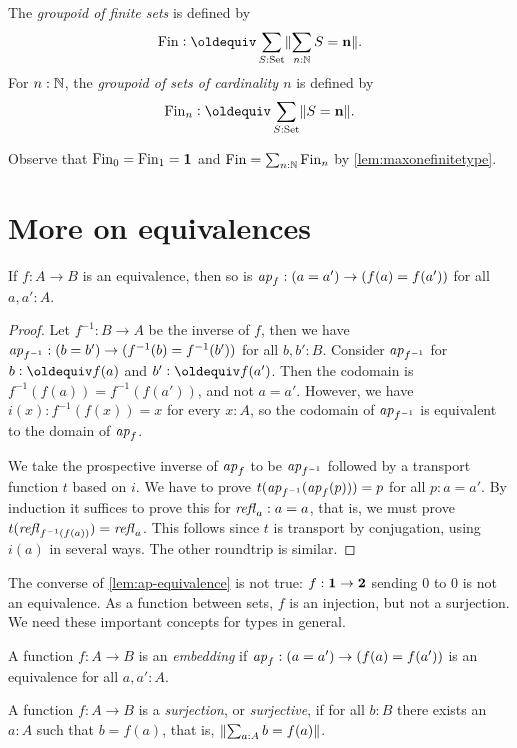 \begin{definition}
\begin{definition}\label{def:groupoidFin}
The \emph{groupoid of finite sets} is defined by
\[
\fin\defeq\sum_{S:\Set}\Trunc{\sum_{n:\NN}S=\bn{n}}.
\]
For $n:\mathbb{N}$, the \emph{groupoid of sets of cardinality $n$} is defined by
\[
\fin_n\defequi \sum_{S:\Set}\Trunc{S=\bn{n}}.
\]
\end{definition}
Observe that $\operatorname{Fin}_0=\operatorname{Fin}_1=\mathbf{1} $ and $\operatorname{Fin}=\sum_{n:\mathbb{N}}\operatorname{Fin}_n$
by \cref{lem:maxonefinitetype}.

\section{More on equivalences}
\label{sec:more-on-equivalences}

\begin{lemma}\label{lem:ap-equivalence}
If $f:A\to B$ is an equivalence, then so is
$\mathop{{\it ap}_{f}}: (a=a') \to (f(a)=f(a'))$ for all $a,a':A$.
\end{lemma}
\begin{proof}
Let $f^{-1} : B\to A$ be the inverse of $f$, then we have 
$\mathop{{\it ap}_{f^{-1}}}: (b=b') \to (f^{-1}(b)=f^{-1}(b'))$ for all $b,b':B$.
Consider $\mathop{{\it ap}_{f^{-1}}}$ for $b\defeq f(a)$ and $b'\defeq f(a')$.
Then the codomain is $f^{-1}(f(a))=f^{-1}(f(a'))$, and not $a=a'$.
However, we have $i(x):f^{-1}(f(x))=x$ for every $x:A$, so the 
codomain of $\mathop{{\it ap}_{f^{-1}}}$ is equivalent to the domain of $\mathop{{\it ap}_{f}}$.

We take the prospective inverse of $\mathop{{\it ap}_{f}}$ to be $\mathop{{\it ap}_{f^{-1}}}$
followed by a transport function $t$ based on $i$. 
We have to prove $t(\mathop{{\it ap}_{f^{-1}}}(\mathop{{\it ap}_{f}}(p)))=p$ for all $p:a=a'$.
By induction it suffices to prove this for $\mathop{{\it refl}_{a}}:a=a$,
that is, we must prove $t(\mathop{{\it refl}_{f^{-1}(f(a))}})=\mathop{{\it refl}_{a}}$.
This follows since $t$ is transport by conjugation,
using $i(a)$ in several ways. The other roundtrip is similar.
\end{proof}

The converse of \cref{lem:ap-equivalence} is not
true: $f:\mathbf{1}\to\mathbf{2}$ sending $0$ to $0$ is not an
equivalence. As a function between sets,
$f$ is an injection, but not a surjection.
We need these important concepts for types in general.

\begin{definition}\label{def:embedding}
A function $f:A\to B$ is an \emph{embedding} if
$\mathop{{\it ap}_{f}}: (a=a') \to (f(a)=f(a'))$ is an equivalence for all $a,a':A$.

A function $f:A\to B$ is a \emph{surjection}, or \emph{surjective},
if for all $b:B$ there exists an $a:A$ such that $b=f(a)$,
that is, $\lVert\sum_{a:A} b=f(a)\rVert$.


\end{definition}
\end{definition}
